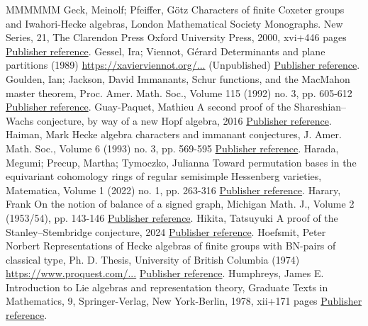 \documentclass[11pt]{article}
\theoremstyle{definition}
\numberwithin{equation}{section}
\begin{document}
\begin{thebibliography}{MMMMMM}
 Geck, Meinolf; Pfeiffer, Götz Characters of finite Coxeter groups and Iwahori-Hecke algebras, London Mathematical Society Monographs. New Series, 21, The Clarendon Press Oxford University Press, 2000, xvi+446 pages \href{https://alco.centre-mersenne.org/articles/10.5802/alco.459/#GPCharHecke}{Publisher reference}.
 Gessel, Ira; Viennot, Gérard Determinants and plane partitions (1989) \url{https://xavierviennot.org/...} (Unpublished) \href{https://alco.centre-mersenne.org/articles/10.5802/alco.459/#GV}{Publisher reference}.
 Goulden, Ian; Jackson, David Immanants, Schur functions, and the MacMahon master theorem, Proc. Amer. Math. Soc., Volume 115 (1992) no. 3, pp. 605-612 \href{https://alco.centre-mersenne.org/articles/10.5802/alco.459/#GJMaster}{Publisher reference}.
 Guay-Paquet, Mathieu A second proof of the Shareshian–Wachs conjecture, by way of a new Hopf algebra, 2016 \href{https://alco.centre-mersenne.org/articles/10.5802/alco.459/#GPSecondPf}{Publisher reference}.
 Haiman, Mark Hecke algebra characters and immanant conjectures, J. Amer. Math. Soc., Volume 6 (1993) no. 3, pp. 569-595 \href{https://alco.centre-mersenne.org/articles/10.5802/alco.459/#HaimanHecke}{Publisher reference}.
 Harada, Megumi; Precup, Martha; Tymoczko, Julianna Toward permutation bases in the equivariant cohomology rings of regular semisimple Hessenberg varieties, Matematica, Volume 1 (2022) no. 1, pp. 263-316 \href{https://alco.centre-mersenne.org/articles/10.5802/alco.459/#HPTPermutationBases}{Publisher reference}.
 Harary, Frank On the notion of balance of a signed graph, Michigan Math. J., Volume 2 (1953/54), pp. 143-146 \href{https://alco.centre-mersenne.org/articles/10.5802/alco.459/#HararyNBSG}{Publisher reference}.
 Hikita, Tatsuyuki A proof of the Stanley–Stembridge conjecture, 2024 \href{https://alco.centre-mersenne.org/articles/10.5802/alco.459/#HikitaProof}{Publisher reference}.
 Hoefsmit, Peter Norbert Representations of Hecke algebras of finite groups with BN-pairs of classical type, Ph. D. Thesis, University of British Columbia (1974) \url{https://www.proquest.com/...} \href{https://alco.centre-mersenne.org/articles/10.5802/alco.459/#HoefsmitThesis}{Publisher reference}.
 Humphreys, James E. Introduction to Lie algebras and representation theory, Graduate Texts in Mathematics, 9, Springer-Verlag, New York-Berlin, 1978, xii+171 pages \href{https://alco.centre-mersenne.org/articles/10.5802/alco.459/#Hum2}{Publisher reference}.

\end{thebibliography}
\end{document}
